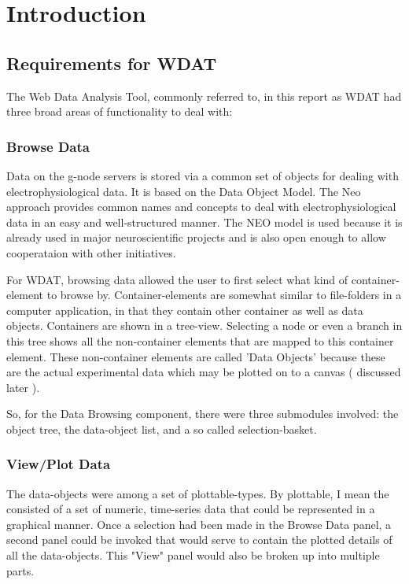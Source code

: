 \chapter{Introduction}

\section{Requirements for WDAT}

The Web Data Analysis Tool, commonly referred to, in this report as
WDAT had three broad areas of functionality to deal with: 

\subsection{Browse Data}

Data on the g-node servers is stored via a common set of objects
for dealing with electrophysiological data.  It is based on the
 Data
Object Model.  The Neo approach provides common names and concepts to
deal with electrophysiological data in an easy and well-structured
manner.  The NEO model is used because it is already used in major
neuroscientific projects and is also open enough to allow cooperataion
with other initiatives.

For WDAT, browsing data allowed the user to first select what kind of
container-element to browse by.  Container-elements are somewhat
similar to file-folders in a computer application, in that they
contain other container as well as data objects.  Containers are
shown in a tree-view.  Selecting a node or even a branch in this tree
shows all the non-container elements that are mapped to this container
element.  These non-container elements are called 'Data Objects' because
these are the actual experimental data which may be plotted on to a
canvas ( discussed later ).

So, for the Data Browsing component, there were three submodules
involved: the object tree, the data-object list, and a so called
selection-basket.

\subsection{View/Plot Data}

The data-objects were among a set of plottable-types.  By plottable, I
mean the consisted of a set of numeric, time-series data that could be
represented in a graphical manner.  Once a selection had been made in
the Browse Data panel, a  second panel could be invoked that would
serve to contain the plotted details of all the data-objects.  This
"View" panel would also be broken up into multiple parts.

